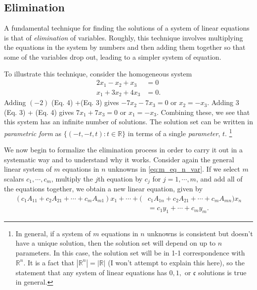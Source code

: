 \documentclass[12pt,letterpaper,reqno]{article}
\numberwithin{equation}{section}
\newcommand{\ti}[1]{\textit{#1}}
\begin{document}
\subsection{Elimination}
A fundamental technique for finding the solutions of a system of linear equations is that of \ti{elimination} of variables. Roughly, this technique involves multiplying the equations in the system by numbers and then adding them together so that some of the variables drop out, leading to a simpler system of equation.
\begin{example}
To illustrate this technique, consider the homogeneous system
	\begin{equation}
		\begin{split}
		2x_1-x_2+x_3&=0 \\
		x_1+3x_2+4x_3&=0.
		\end{split}
	\end{equation} 
Adding $(-2)$ (Eq. 4) +(Eq. 3)  gives $-7x_2-7x_3=0$ or $x_2=-x_3$. Adding
$3$ (Eq. 3) + (Eq. 4) gives $7x_1+7x_3=0$ or $x_1=-x_3$. 
Combining these, we see that this system has an infinite number of solutions. The solution set can be written in \ti{parametric form} as $\{(-t,-t,t): t \in \mathbb{R}\}$ in terms of a single \ti{parameter}, $t$. \footnote{In general, if a system of $m$ equations in $n$ unknowns is consistent but doesn't have a unique solution, then the solution set will depend on up to $n$ parameters. In this case, the solution set will be in 1-1 correspondence with $\mathbb{R}^n$. It is a fact that $|\mathbb{R}^n|=|\mathbb{R}|$ (I won't attempt to explain this here), so the statement that any system of linear equations has $0,1,$ or $\mathfrak{c}$ solutions is true in general.} 
\end{example}
We now begin to formalize the elimination process in order to carry it out in a systematic way and to understand why it works. Consider again the general linear system of $m$ equations in $n$ unknowns in \eqref{eq:m_eq_n_var}. If we select $m$ scalars $c_1,\cdots,c_m$, multiply the $j$th equation by $c_j$ for $j=1,\cdots,m$, and add all of the equations together, we obtain a new linear equation, given by
\begin{equation}\label{eq:linear_combination_of_equations}
	\begin{split}
		(c_1A_{11}+c_2A_{21}+\cdots+c_mA_{m1})x_1+\cdots+(&c_1A_{1n}+c_2A_{21}+\cdots+c_mA_{mn})x_n \\ &= c_1y_1+\cdots +c_m y_m.
	\end{split}
\end{equation}
\end{document}
